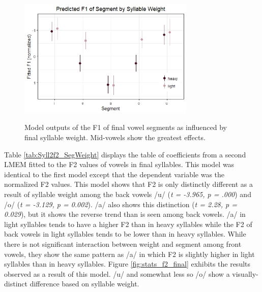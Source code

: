 \documentclass[12pt]{ouparticle}
\begin{document}
\begin{figure}[h!]
    \centering
    \caption{Model outputs of the F1 of final vowel segments as influenced by final syllable weight. Mid-vowels show the greatest effects.}
    \includegraphics[width=0.75\textwidth]{Figure5.jpg}
    \label{fig:stats_f1_final}
\end{figure}

\newpage

Table \ref{tab:Syll2f2_SegWeight} displays the table of coefficients from a second LMEM fitted to the F2 values of vowels in final syllables. This model was identical to the first model except that the dependent variable was the normalized F2 values. This model shows that F2 is only distinctly different as a result of syllable weight among the back vowels /u/ (\textit{t = -3.965, p = .000}) and /o/ (\textit{t = -3.129, p = 0.002}). /a/ also shows this distinction (\textit{t = 2.28, p = 0.029}), but it shows the reverse trend than is seen among back vowels. /a/ in light syllables tends to have a higher F2 than in heavy syllables while the F2 of back vowels in light syllables tends to be lower than in heavy syllables. While there is not significant interaction between weight and segment among front vowels, they show the same pattern as /a/ in which F2 is slightly higher in light syllables than in heavy syllables. Figure \ref{fig:stats_f2_final} exhibits the results observed as a result of this model. /u/ and somewhat less so /o/ show a visually-distinct difference based on syllable weight.
\end{document}
